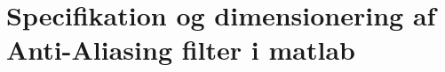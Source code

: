 \chapter{Specifikation og dimensionering af Anti-Aliasing filter i matlab}\label{bilag:aafilterspec}
